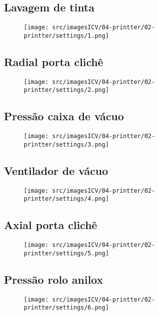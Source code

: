 \thispagestyle{fancy}
\vspace{\fill}
\subsection{Lavagem de tinta}
\begin{figure}
    \centering
    \texttt{[image: src/imagesICV/04-printter/02-printter/settings/1.png]}
\end{figure}

\newpage
\thispagestyle{fancy}
\vspace{\fill}
\subsection{Radial porta clichê}
\begin{figure}
    \centering
    \texttt{[image: src/imagesICV/04-printter/02-printter/settings/2.png]}
\end{figure}

\newpage
\thispagestyle{fancy}
\vspace{\fill}
\subsection{Pressão caixa de vácuo}
\begin{figure}
    \centering
    \texttt{[image: src/imagesICV/04-printter/02-printter/settings/3.png]}
\end{figure}
\newpage

\thispagestyle{fancy}
\vspace{\fill}
\subsection{Ventilador de vácuo}
\begin{figure}
    \centering
    \texttt{[image: src/imagesICV/04-printter/02-printter/settings/4.png]}
\end{figure}

\newpage
\thispagestyle{fancy}
\vspace{\fill}
\subsection{Axial porta clichê}
\begin{figure}
    \centering
    \texttt{[image: src/imagesICV/04-printter/02-printter/settings/5.png]}
\end{figure}
\newpage

\thispagestyle{fancy}
\vspace{\fill}
\subsection{Pressão rolo anilox}
\begin{figure}
    \centering
    \texttt{[image: src/imagesICV/04-printter/02-printter/settings/6.png]}
\end{figure}
